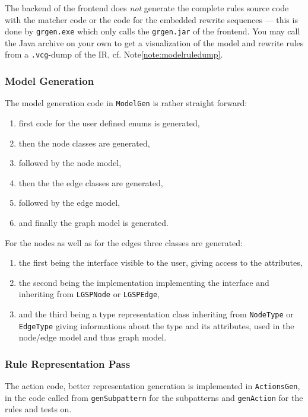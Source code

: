 The backend of the frontend does \emph{not} generate the complete rules source code with the matcher code or the code for the embedded rewrite sequences --- this is done by \texttt{grgen.exe} which only calls the \texttt{grgen.jar} of the frontend.
You may call the Java archive on your own to get a visualization of the model and rewrite rules from a \texttt{.vcg}-dump of the IR, cf. Note\ref{note:modelruledump}.


\subsubsection*{Model Generation}

The model generation code in \texttt{ModelGen} is rather straight forward:
\begin{enumerate}
	\item first code for the user defined enums is generated,
	\item then the node classes are generated,
	\item followed by the node model,
	\item then the the edge classes are generated,
	\item followed by the edge model,
	\item and finally the graph model is generated.
\end{enumerate}

\noindent For the nodes as well as for the edges three classes are generated:
\begin{enumerate}
	\item the first being the interface visible to the user, giving access to the attributes,
	\item the second being the implementation implementing the interface and inheriting from \texttt{LGSPNode} or \texttt{LGSPEdge},
	\item and the third being a type representation class inheriting from \texttt{NodeType} or \texttt{EdgeType} giving informations about the type and its attributes, used in the node/edge model and thus graph model.
\end{enumerate}


\subsubsection*{Rule Representation Pass}

The action code, better representation generation is implemented in \texttt{ActionsGen}, in the code called from \texttt{gen\-Subpattern} for the subpatterns and \texttt{gen\-Action} for the rules and tests on.

